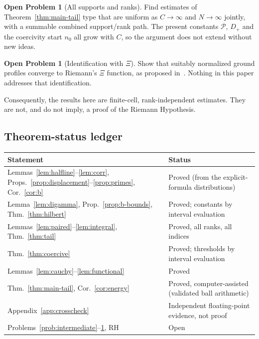 \documentclass[11pt,a4paper]{article}
\theoremstyle{definition}
\newtheorem{problem}[theorem]{Open Problem}
\begin{document}
\begin{problem}[All supports and ranks]
Find estimates of Theorem~\ref{thm:main-tail} type that are uniform as
$C\to\infty$ and $N\to\infty$ jointly, with a summable combined
support/rank path. The present constants $\mathcal P$, $D_{+}$ and the
coercivity start $n_0$ all grow with $C$, so the argument does not
extend without new ideas.
\end{problem}

\begin{problem}[Identification with $\Xi$]\label{prob:xi}
Show that suitably normalized ground profiles converge to Riemann's
$\Xi$ function, as proposed in~\cite[\S7]{CCM2025}. Nothing in this paper
addresses that identification.
\end{problem}

Consequently, the results here are finite-cell, rank-independent
estimates. They are not, and do not imply, a proof of the Riemann
Hypothesis.

\subsection*{Theorem-status ledger}
\begin{center}
\begin{tabular}{@{}p{}p{}@{}}
\toprule
Statement & Status\\
\midrule
Lemmas~\ref{lem:halfline}--\ref{lem:corr}, Props.~\ref{prop:displacement}--\ref{prop:primes}, Cor.~\ref{cor:b} & Proved (from the explicit-formula distributions)\\
Lemma~\ref{lem:digamma}, Prop.~\ref{prop:b-bounds}, Thm.~\ref{thm:hilbert} & Proved; constants by interval evaluation\\
Lemmas~\ref{lem:paired}--\ref{lem:integral}, Thm.~\ref{thm:tail} & Proved, all ranks, all indices\\
Thm.~\ref{thm:coercive} & Proved; thresholds by interval evaluation\\
Lemmas~\ref{lem:cauchy}--\ref{lem:functional} & Proved\\
Thm.~\ref{thm:main-tail}, Cor.~\ref{cor:energy} & Proved, computer-assisted (validated ball arithmetic)\\
Appendix~\ref{app:crosscheck} & Independent floating-point evidence, not proof\\
Problems~\ref{prob:intermediate}--\ref{prob:xi}, RH & Open\\
\bottomrule
\end{tabular}
\end{center}
\end{document}
